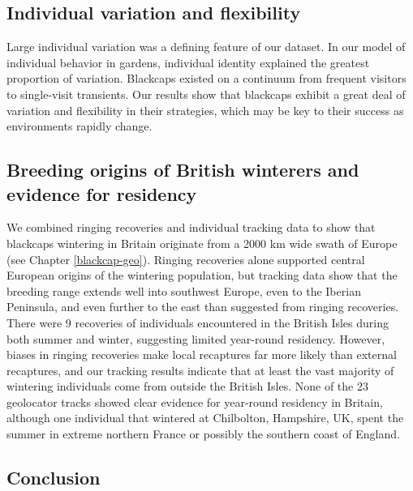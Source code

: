 \documentclass[a4paper, nobind]{templates/ociamthesis}
\begin{document}
\hypertarget{individual-variation-and-flexibility}{%
\subsection{Individual variation and flexibility}\label{individual-variation-and-flexibility}}

Large individual variation was a defining feature of our dataset. In our model of individual behavior in gardens, individual identity explained the greatest proportion of variation. Blackcaps existed on a continuum from frequent visitors to single-visit transients. Our results show that blackcaps exhibit a great deal of variation and flexibility in their strategies, which may be key to their success as environments rapidly change.

\hypertarget{breeding-origins-of-british-winterers-and-evidence-for-residency}{%
\subsection{Breeding origins of British winterers and evidence for residency}\label{breeding-origins-of-british-winterers-and-evidence-for-residency}}

We combined ringing recoveries and individual tracking data to show that blackcaps wintering in Britain originate from a 2000 km wide swath of Europe (see Chapter \ref{blackcap-geo}). Ringing recoveries alone supported central European origins of the wintering population, but tracking data show that the breeding range extends well into southwest Europe, even to the Iberian Peninsula, and even further to the east than suggested from ringing recoveries. There were 9 recoveries of individuals encountered in the British Isles during both summer and winter, suggesting limited year-round residency. However, biases in ringing recoveries make local recaptures far more likely than external recaptures, and our tracking results indicate that at least the vast majority of wintering individuals come from outside the British Isles. None of the 23 geolocator tracks showed clear evidence for year-round residency in Britain, although one individual that wintered at Chilbolton, Hampshire, UK, spent the summer in extreme northern France or possibly the southern coast of England.

\hypertarget{conclusion-1}{%
\subsection{Conclusion}\label{conclusion-1}}
\end{document}
